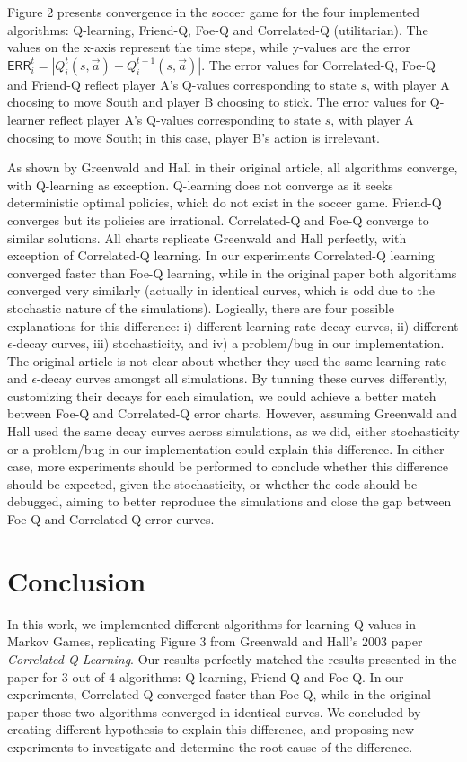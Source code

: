 \documentclass{article}
\begin{document}
    Figure 2 presents convergence in the soccer game for the four implemented algorithms: Q-learning, Friend-Q, Foe-Q and Correlated-Q (utilitarian).
    The values on the x-axis represent the time steps, while y-values are the error $\mathsf{ERR}_{i}^{t} = | Q_{i}^{t}(s, \vec{a}) - Q_{i}^{t - 1}(s, \vec{a}) |$.
    The error values for Correlated-Q, Foe-Q and Friend-Q reflect player A's Q-values corresponding to state $s$, with player A choosing to move South and player B choosing to stick.
    The error values for Q-learner reflect player A's Q-values corresponding to state $s$, with player A choosing to move South; in this case, player B's action is irrelevant.

    As shown by Greenwald and Hall in their original article, all algorithms converge, with Q-learning as exception.
    Q-learning does not converge as it seeks deterministic optimal policies, which do not exist in the soccer game.
    Friend-Q converges but its policies are irrational.
    Correlated-Q and Foe-Q converge to similar solutions.
    All charts replicate Greenwald and Hall perfectly, with exception of Correlated-Q learning.
    In our experiments Correlated-Q learning converged faster than Foe-Q learning, while in the original paper both algorithms converged very similarly (actually in identical curves, which is odd due to the stochastic nature of the simulations).
    Logically, there are four possible explanations for this difference: i) different learning rate decay curves, ii) different $\epsilon$-decay curves, iii) stochasticity, and iv) a problem/bug in our implementation.
    The original article is not clear about whether they used the same learning rate and $\epsilon$-decay curves amongst all simulations.
    By tunning these curves differently, customizing their decays for each simulation, we could achieve a better match between Foe-Q and Correlated-Q error charts.
    However, assuming Greenwald and Hall used the same decay curves across simulations, as we did, either stochasticity or a problem/bug in our implementation could explain this difference.
    In either case, more experiments should be performed to conclude whether this difference should be expected, given the stochasticity, or whether the code should be debugged, aiming to better reproduce the simulations and close the gap between Foe-Q and Correlated-Q error curves.

    \section{Conclusion}
    \label{sec:conclusion}

    In this work, we implemented different algorithms for learning Q-values in Markov Games, replicating Figure 3 from Greenwald and Hall's 2003 paper \emph{Correlated-Q Learning}.
    Our results perfectly matched the results presented in the paper for 3 out of 4 algorithms: Q-learning, Friend-Q and Foe-Q.
    In our experiments, Correlated-Q converged faster than Foe-Q, while in the original paper those two algorithms converged in identical curves.
    We concluded by creating different hypothesis to explain this difference, and proposing new experiments to investigate and determine the root cause of the difference.

\printbibliography
\end{document}
